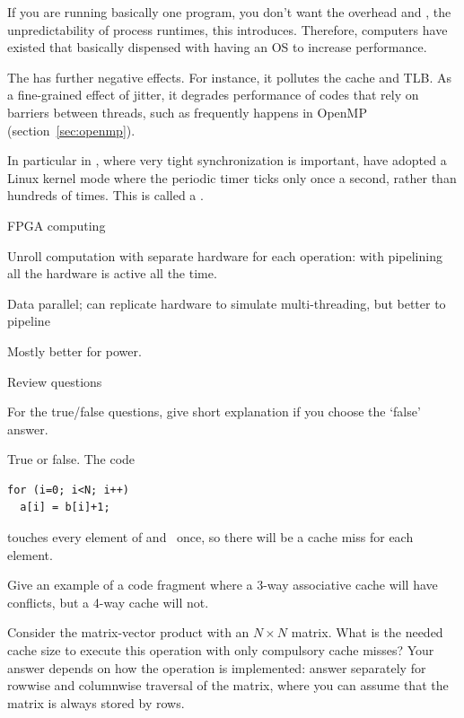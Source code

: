If you are running basically one program, you don't want the overhead and
, the unpredictability of process
runtimes, this introduces. Therefore, computers have existed that basically dispensed
with having an \ac{OS} to increase performance.

The  has further negative
effects. For instance, it pollutes the cache and
\ac{TLB}. As a fine-grained effect of jitter, it degrades performance
of codes that rely on barriers between threads, such as frequently
happens in OpenMP (section~\ref{sec:openmp}).

In particular in , where very tight
synchronization is important, have adopted a Linux kernel mode where
the periodic timer ticks only once a second, rather than hundreds of
times. This is called a .

\begin{notready}
 {FPGA computing}

Unroll computation with separate hardware for each operation:
with pipelining all the hardware is active all the time.

Data parallel; can replicate hardware to simulate multi-threading, but
better to pipeline

Mostly better for power.
\end{notready}

\begin{notlulu}
 {Review questions}

For the true/false questions, give short explanation if you choose the `false' answer.

\begin{exercise}
  True or false. The code
\begin{verbatim}
for (i=0; i<N; i++)
  a[i] = b[i]+1;
\end{verbatim}
touches every element of  and~ once, so there will be a cache miss
for each element.
\end{exercise}

\begin{exercise}
  Give an example of a code fragment where a 3-way associative cache will
  have conflicts, but a 4-way cache will not.
\end{exercise}

\begin{exercise}
  Consider the matrix-vector product with an $N\times N$ matrix.
  What is the needed cache size to execute this operation with only
  compulsory cache misses? Your answer depends on how the operation
  is implemented: answer separately for rowwise and columnwise traversal
  of the matrix, where you can assume that the matrix is always stored by rows.
\end{exercise}
\end{notlulu}

